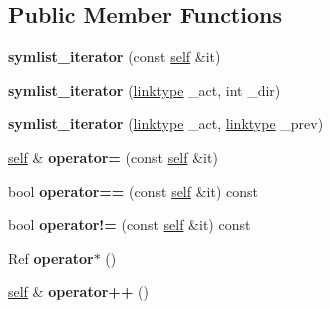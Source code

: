 \subsection*{Public Member Functions}
\begin{DoxyCompactItemize}
\item 
\mbox{\label{structsymlist__iterator_ad2bfdc772635fde5f302c197e3aecb3a}} 
{\bfseries symlist\+\_\+iterator} (const \mbox{\hyperlink{structsymlist__iterator}{self}} \&it)
\item 
\mbox{\label{structsymlist__iterator_addbd9bd7f755bf6272b0f4cc0c37cd5e}} 
{\bfseries symlist\+\_\+iterator} (\mbox{\hyperlink{structsymnode}{linktype}} \+\_\+act, int \+\_\+dir)
\item 
\mbox{\label{structsymlist__iterator_a747f066c9c718ffc91688c5c4ed96f59}} 
{\bfseries symlist\+\_\+iterator} (\mbox{\hyperlink{structsymnode}{linktype}} \+\_\+act, \mbox{\hyperlink{structsymnode}{linktype}} \+\_\+prev)
\item 
\mbox{\label{structsymlist__iterator_a06f2e1a93beb87afd09795b7f3898bdd}} 
\mbox{\hyperlink{structsymlist__iterator}{self}} \& {\bfseries operator=} (const \mbox{\hyperlink{structsymlist__iterator}{self}} \&it)
\item 
\mbox{\label{structsymlist__iterator_ace4bd4255b49937b7ee77d2f726ccf0b}} 
bool {\bfseries operator==} (const \mbox{\hyperlink{structsymlist__iterator}{self}} \&it) const
\item 
\mbox{\label{structsymlist__iterator_ac440e4e4d3f66483a699eebc8ba1ed6e}} 
bool {\bfseries operator!=} (const \mbox{\hyperlink{structsymlist__iterator}{self}} \&it) const
\item 
\mbox{\label{structsymlist__iterator_adcb398097fb58caeb6c55ef78744bccf}} 
Ref {\bfseries operator$\ast$} ()
\item 
\mbox{\label{structsymlist__iterator_a04939591b3f553d3e59b004d07cc8598}} 
\mbox{\hyperlink{structsymlist__iterator}{self}} \& {\bfseries operator++} ()
\item 

\end{DoxyCompactItemize}
